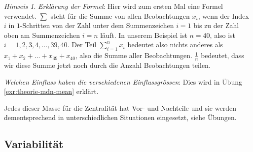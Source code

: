 \documentclass[
]{book}
\theoremstyle{definition}
\theoremstyle{definition}
\theoremstyle{definition}
\theoremstyle{definition}
\theoremstyle{remark}
\newtheorem*{remark}{Hinweis}
\begin{document}
\begin{caution}

\begin{remark}
\emph{Erklärung der Formel}: Hier wird zum ersten Mal eine Formel verwendet. \(\sum\) steht für die Summe von allen Beobachtungen \(x_i\), wenn der Index \(i\) in \(1\)-Schritten von der Zahl unter dem Summenzeichen \(i=1\) bis zu der Zahl oben am Summenzeichen \(i=n\) läuft. In unserem Beispiel ist \(n=40\), also ist \(i = 1, 2, 3, 4, \ldots, 39, 40\). Der Teil \(\sum^n_{i=1} x_i\) bedeutet also nichts anderes als \(x_1 + x_2 + \ldots + x_{39} + x_{40}\), also die Summe aller Beobachtungen. \(\frac{1}{n}\) bedeutet, dass wir diese Summe jetzt noch durch die Anzahl Beobachtungen teilen.

\emph{Welchen Einfluss haben die verschiedenen Einflussgrössen}: Dies wird in Übung \ref{exr:theorie-mdn-mean} erklärt.
\end{remark}

\end{caution}

Jedes dieser Masse für die Zentralität hat Vor- und Nachteile und sie werden dementsprechend in unterschiedlichen Situationen eingesetzt, siehe Übungen.

\subsection{Variabilität}\label{variabilitaet}
\end{document}
